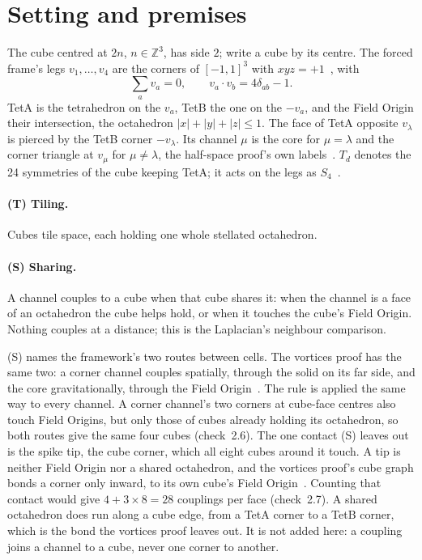 \documentclass[twocolumn]{iopjournal}
\begin{document}

\section*{Setting and premises}

The cube centred at $2n$, $n \in \mathbb Z^3$, has side $2$; write a
cube by its centre. The forced frame's legs $v_1, \dots, v_4$ are the
corners of $[-1,1]^3$ with $xyz = +1$~\cite{NelsonForced,NelsonGram},
with
\begin{equation}
  \textstyle\sum_a v_a = 0, \qquad v_a \cdot v_b = 4\delta_{ab} - 1 .
  \label{eq:frame}
\end{equation}
TetA is the tetrahedron on the $v_a$, TetB the one on the $-v_a$,
and the Field Origin their intersection, the octahedron
$|x| + |y| + |z| \le 1$. The face of TetA opposite $v_\lambda$ is
pierced by the TetB corner $-v_\lambda$. Its channel $\mu$ is the
core for $\mu = \lambda$ and the corner triangle at $v_\mu$ for
$\mu \neq \lambda$, the half-space proof's own labels~\cite{NelsonHalf}.
$T_d$ denotes the 24 symmetries of the cube keeping TetA; it acts on
the legs as $S_4$~\cite{NelsonGram}.

\paragraph{(T) Tiling.} Cubes tile space, each holding one whole
stellated octahedron.

\paragraph{(S) Sharing.} A channel couples to a cube when that cube
shares it: when the channel is a face of an octahedron the cube helps
hold, or when it touches the cube's Field Origin. Nothing couples at
a distance; this is the Laplacian's neighbour comparison.

\medskip\noindent
(S) names the framework's two routes between cells. The vortices
proof has the same two: a corner channel couples spatially, through
the solid on its far side, and the core gravitationally, through the
Field Origin~\cite{NelsonVortex}. The rule is applied the same way to
every channel. A corner channel's two corners at cube-face centres
also touch Field Origins, but only those of cubes already holding its
octahedron, so both routes give the same four cubes (check~2.6). The
one contact (S) leaves out is the spike tip, the cube corner, which
all eight cubes around it touch. A tip is neither Field Origin nor a
shared octahedron, and the vortices proof's cube graph bonds a corner
only inward, to its own cube's Field Origin~\cite{NelsonVortex}.
Counting that contact would give $4 + 3 \times 8 = 28$ couplings per
face (check~2.7). A shared octahedron does run along a cube edge,
from a TetA corner to a TetB corner, which is the bond the vortices
proof leaves out. It is not added here: a coupling joins a channel to
a cube, never one corner to another.
\end{document}
